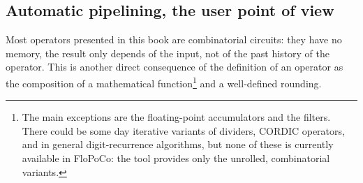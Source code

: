 \documentclass{article}
\begin{document}



\subsection{Automatic pipelining, the user point of view\label{sec:flopoco:pipelining:user}}

Most operators presented in this book are combinatorial circuits: they have no memory, the result only depends of the input, not of the past history of the operator. 
This is another direct consequence of the definition of an operator as the composition of a mathematical function\footnote{The main exceptions are the floating-point accumulators and the filters. There could be some day iterative variants of dividers, CORDIC operators, and in general digit-recurrence algorithms, but none of these is currently available in FloPoCo: the tool provides only the unrolled, combinatorial variants.} and a well-defined rounding.
\end{document}
